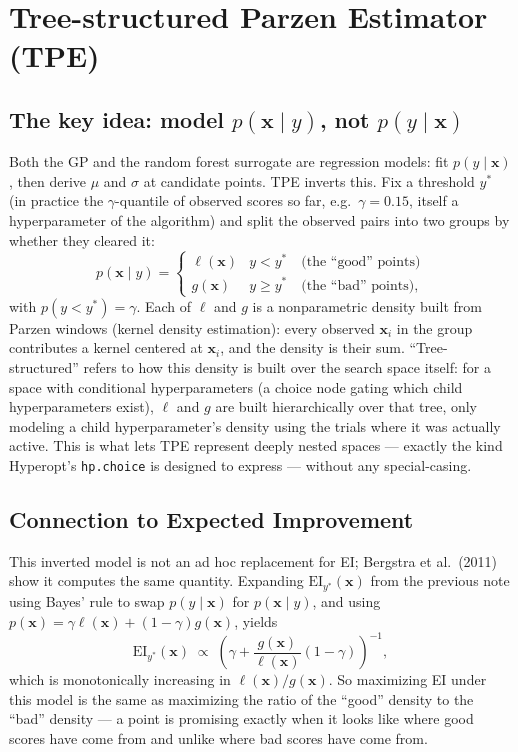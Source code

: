 \documentclass[conference]{IEEEtran}
\begin{document}
\section*{Tree-structured Parzen Estimator (TPE)}
\subsection*{The key idea: model $p(\mathbf{x} \mid y)$, not $p(y \mid \mathbf{x})$}
Both the GP and the random forest surrogate are regression models: fit $p(y \mid \mathbf{x})$, then derive $\mu$ and $\sigma$ at candidate points. TPE inverts this. Fix a threshold $y^{*}$ (in practice the $\gamma$-quantile of observed scores so far, e.g.\ $\gamma = 0.15$, itself a hyperparameter of the algorithm) and split the observed pairs into two groups by whether they cleared it:
\begin{equation}
    p(\mathbf{x} \mid y) =
    \begin{cases}
        \ell(\mathbf{x}) & y < y^{*} \quad \text{(the ``good'' points)} \\
        g(\mathbf{x}) & y \geq y^{*} \quad \text{(the ``bad'' points),}
    \end{cases}
\end{equation}
with $p(y < y^{*}) = \gamma$. Each of $\ell$ and $g$ is a nonparametric density built from Parzen windows (kernel density estimation): every observed $\mathbf{x}_i$ in the group contributes a kernel centered at $\mathbf{x}_i$, and the density is their sum. ``Tree-structured'' refers to how this density is built over the search space itself: for a space with conditional hyperparameters (a choice node gating which child hyperparameters exist), $\ell$ and $g$ are built hierarchically over that tree, only modeling a child hyperparameter's density using the trials where it was actually active. This is what lets TPE represent deeply nested spaces --- exactly the kind Hyperopt's \texttt{hp.choice} is designed to express --- without any special-casing.

\subsection*{Connection to Expected Improvement}
This inverted model is not an ad hoc replacement for EI; Bergstra et al.\ (2011) show it computes the same quantity. Expanding $\mathrm{EI}_{y^{*}}(\mathbf{x})$ from the previous note using Bayes' rule to swap $p(y \mid \mathbf{x})$ for $p(\mathbf{x} \mid y)$, and using $p(\mathbf{x}) = \gamma \ell(\mathbf{x}) + (1-\gamma) g(\mathbf{x})$, yields
\begin{equation}
    \mathrm{EI}_{y^{*}}(\mathbf{x}) \;\propto\; \left(\gamma + \frac{g(\mathbf{x})}{\ell(\mathbf{x})}(1-\gamma)\right)^{-1},
\end{equation}
which is monotonically increasing in $\ell(\mathbf{x})/g(\mathbf{x})$. So maximizing EI under this model is the same as maximizing the ratio of the ``good'' density to the ``bad'' density --- a point is promising exactly when it looks like where good scores have come from and unlike where bad scores have come from.
\end{document}
